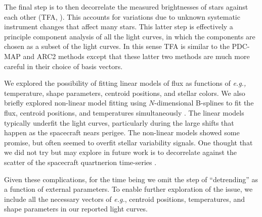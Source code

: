 \documentclass[12pt,twocolumn,tighten]{aastex62}
\begin{document}
The final step is to then decorrelate the measured brightnesses of
stars against each other (TFA, \citealt{kovacs_trend_2005}).  This
accounts for variations due to unknown systematic instrument changes
that affect many stars.  This latter step is effectively a principle
component analysis of all the light curves, in which the components
are chosen as a subset of the light curves.
In this sense TFA is similar to the PDC-MAP and ARC2 methods
\citep{smith_pdc_2012,aigrain_robust_2017} except that these latter
two methods are much more careful in their choice of basis vectors.

We explored the possibility of fitting linear models of flux as
functions of {\it e.g.,} temperature, shape parameters, centroid
positions, and stellar colors.  We also briefly explored non-linear
model fitting using $N$-dimensional B-splines to fit the flux,
centroid positions, and temperatures simultaneously
\citep{dierckx_curve_1996}.  The linear models typically underfit the
light curves, particularly during the large shifts that happen as the
spacecraft nears perigee.  The non-linear models showed some promise,
but often seemed to overfit stellar variability signals.  One thought
that we did not try but may explore in future work is to decorrelate
against the scatter of the spacecraft quartnerion time-series
\citep{vanderburg_hr858_2019}.

Given these complications, for the time being we omit the step of
``detrending'' as a function of external parameters. To enable further
exploration of the issue, we include all the necessary vectors of {\it
e.g.}, centroid positions, temperatures, and shape parameters in our
reported light curves.

% 
\end{document}
